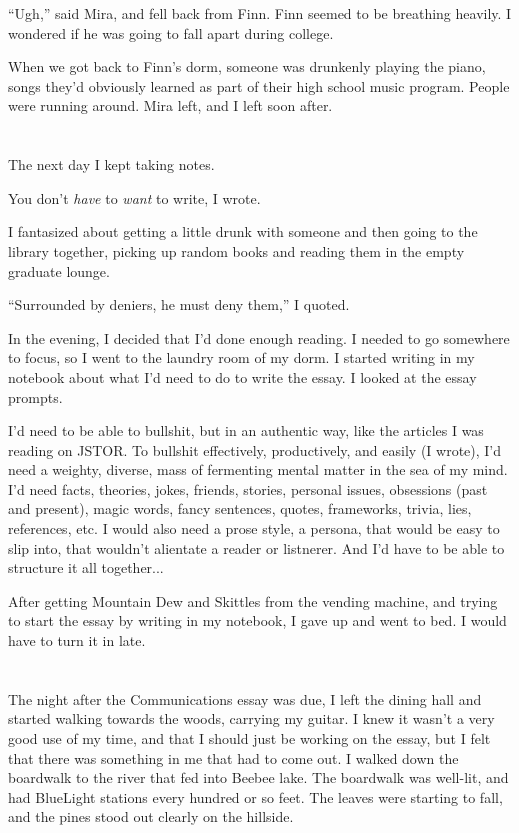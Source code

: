 ``Ugh,'' said Mira, and fell back from Finn.  Finn seemed to be breathing
heavily.  I wondered if he was going to fall apart during college.  

When we got back to Finn's dorm, someone was drunkenly playing the piano, songs
they'd obviously learned as part of their high school music program.  People
were running around.  Mira left, and I left soon after.  

\section{}

The next day I kept taking notes.

You don't \textit{have} to \textit{want} to write, I wrote.

I fantasized about getting a little drunk with someone and then going to the
library together, picking up random books and reading them in the empty graduate
lounge.

``Surrounded by deniers, he must deny them,'' I quoted.

In the evening, I decided that I'd done enough reading.  I needed to go
somewhere to focus, so I went to the laundry room of my dorm.  I started writing
in my notebook about what I'd need to do to write the essay.  I looked at the
essay prompts.

I'd need to be able to bullshit, but in an authentic way, like the articles I
was reading on JSTOR.  To bullshit effectively, productively, and easily  (I
wrote), I'd need a weighty, diverse, mass of fermenting mental matter in the sea
of my mind.  I'd need facts, theories, jokes, friends, stories, personal issues,
obsessions (past and present), magic words, fancy sentences, quotes, frameworks,
trivia, lies, references, etc.  I would also need a prose style, a persona, that
would be easy to slip into, that wouldn't alientate a reader or listnerer.  And
I'd have to be able to structure it all together...

After getting Mountain Dew and Skittles from the vending machine, and trying to
start the essay by writing in my notebook, I gave up and went to bed.  I would
have to turn it in late.

\section{}

The night after the Communications essay was due, I left the dining hall and
started walking towards the woods, carrying my guitar.  I knew it wasn't a very
good use of my time, and that I should just be working on the essay, but I felt
that there was something in me that had to come out.  I walked down the
boardwalk to the river that fed into Beebee lake.  The boardwalk was well-lit,
and had BlueLight stations every hundred or so feet.  The leaves were starting to
fall, and the pines stood out clearly on the hillside.

